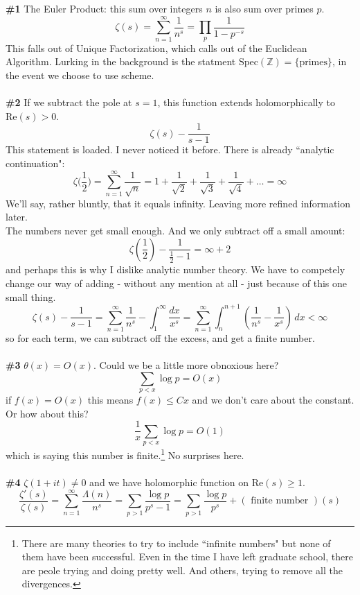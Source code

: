 \documentclass[12pt]{article}
\begin{document}
\newpage

\noindent \textbf{\#1} The Euler Product: this sum over integers $n$ is also sum over primes $p$. 
$$ \zeta(s) = \sum_{n=1}^\infty \frac{1}{n^s} = \prod_p \frac{1}{1 - p^{-s}}$$
This falls out of Unique Factorization, which calls out of the Euclidean Algorithm.  Lurking in the background is the statment $\mathrm{Spec}(\mathbb{Z}) = \{ \text{primes}\}$, in the event we choose to use scheme. \\ \\
\textbf{\#2} If we subtract the pole at $s = 1$, this function extends holomorphically to $\mathrm{Re}(s) > 0$.  
$$ \zeta(s) - \frac{1}{s-1} $$
This statement is loaded.  I never noticed it before.  There is already ``analytic continuation": 
$$ \zeta \big( \frac{1}{2} \big) = \sum_{n=1}^\infty \frac{1}{\sqrt{n}} = 
1 + \frac{1}{\sqrt{2}} +  \frac{1}{\sqrt{3}} +   \frac{1}{\sqrt{4}} + \dots =\infty $$
We'll say, rather bluntly, that it equals infinity.  Leaving more refined information later. \\ The numbers never get small enough. And we only subtract off a small amount:
$$ \zeta(\frac{1}{2}) - \frac{1}{\frac{1}{2}-1} = \infty + 2 $$
and perhaps this is why I dislike analytic number theory.  We have to competely change our way of adding - without any mention at all - just because of this one small thing.
$$  \zeta(s) - \frac{1}{s-1}
= \sum_{n=1}^\infty \frac{1}{n^s} -  \int_1^\infty  \frac{dx}{x^s} 
= \sum_{n=1}^\infty \int_n^{n+1} \left( \frac{1}{n^s} - \frac{1}{x^s} \right) \, dx < \infty $$
so for each term, we can subtract off the excess, and get a finite number. \\ \\
\textbf{\#3} $\theta(x) = O(x)$.  Could we be a little more obnoxious here?
$$   \sum_{p < x} \log p  = O(x)$$
if $f(x) = O(x)$ this means $f(x) \leq C x $ and we don't care about the constant.  Or how about this?
$$ \frac{1}{x} \sum_{p < x} \log p  = O(1) $$
which is saying this number is finite.\footnote{There are many theories to try to include ``infinite numbers" but none of them have been successful.  Even in the time I have left graduate school, there are peole trying and doing pretty well.  And others, trying to remove all the divergences.}  No surprises here.   \\ \\
\textbf{\#4} $\zeta(1 + it) \neq 0$ and we have holomorphic function on $\mathrm{Re}(s) \geq 1$.  
$$ \frac{\zeta'(s)}{\zeta(s)} = \sum_{n=1}^\infty \frac{\Lambda(n) }{n^s} =
\sum_{p> 1} \frac{\log p}{p^s - 1} = 
 \sum_{p > 1} \frac{ \log p }{p^s}  + (\text{ finite number })(s)$$
 
\end{document}

